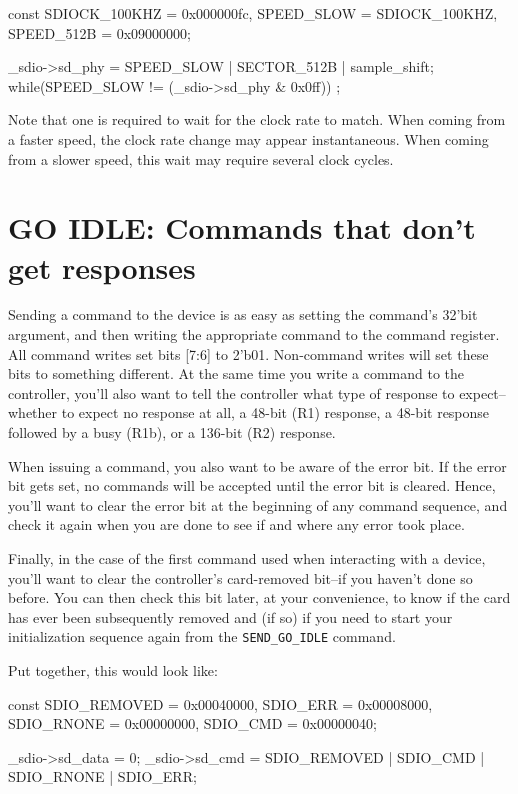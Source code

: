 \documentclass{gqtekspec}
\begin{document}
\begin{zCpp}
	const	SDIOCK_100KHZ = 0x000000fc,
		SPEED_SLOW    = SDIOCK_100KHZ,
		SPEED_512B    = 0x09000000;

	_sdio->sd_phy = SPEED_SLOW | SECTOR_512B | sample_shift;
	while(SPEED_SLOW != (_sdio->sd_phy & 0x0ff))
		;
\end{zCpp}

Note that one is required to wait for the clock rate to match.  When coming
from a faster speed, the clock rate change may appear instantaneous.  When
coming from a slower speed, this wait may require several clock cycles.
\section{GO IDLE: Commands that don't get responses}\label{sec:go-idle}
Sending a command to the device is as easy as setting the command's 32'bit
argument, and then writing the appropriate command to the command register.
All command writes set bits [7:6] to 2'b01.  Non-command writes will set these
bits to something different.  At the same time you write a command to the
controller, you'll also want to tell the controller what type of
response to expect--whether to expect no response at all, a 48-bit (R1)
response, a 48-bit response followed by a busy (R1b), or a 136-bit (R2)
response.


When issuing a command, you also want to be aware of the error bit.  If the
error bit gets set, no commands will be accepted until the error bit is cleared.
Hence, you'll want to clear the error bit at the beginning of any command
sequence, and check it again when you are done to see if and where any error
took place.

Finally, in the case of the first command used when interacting with a device,
you'll want to clear the controller's card-removed bit--if you haven't done
so before.  You can then check this bit later, at your convenience, to know
if the card has ever been subsequently removed and (if so) if you need to start
your initialization sequence again from the {\tt SEND\_GO\_IDLE} command.

Put together, this would look like:
\begin{zCpp}
	const	SDIO_REMOVED = 0x00040000,
		SDIO_ERR     = 0x00008000,
		SDIO_RNONE   = 0x00000000,
		SDIO_CMD     = 0x00000040;

	_sdio->sd_data = 0;
	_sdio->sd_cmd  = SDIO_REMOVED | SDIO_CMD | SDIO_RNONE | SDIO_ERR;
\end{zCpp}
\end{document}
